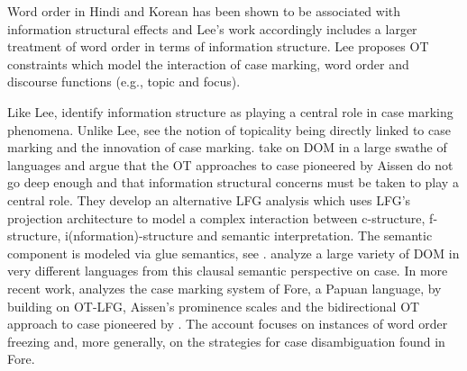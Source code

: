 \documentclass[output=paper,hidelinks]{langscibook}
\begin{document}
 Word order in Hindi and Korean has been shown to be
 associated with information structural effects and Lee's work accordingly
 includes a larger treatment of word order in terms of information structure.
 Lee proposes OT constraints which model the interaction of case marking,
 word order and discourse functions (e.g., topic and focus). 



 Like Lee, \citet{DN} identify information structure as playing a central role in
 case marking phenomena. Unlike Lee, \citet{DN} see the notion of topicality
 being directly linked to case marking and the innovation of case marking.
 \citet{DN} take on DOM in a large swathe of languages and argue that the OT
 approaches to case pioneered by Aissen do not go deep enough and that
 information structural concerns must be taken to play a central role.  They
 develop an alternative LFG analysis which uses LFG's projection architecture to
 model a complex interaction between c-structure, f-structure,
 i(nformation)-structure and semantic interpretation.  The semantic component is
 modeled via glue semantics, see .  \citet{DN} analyze a
 large variety of DOM in very different languages from this clausal semantic
 perspective on case.  In more recent work, \citet{donohue20} analyzes the case
 marking system of Fore, a Papuan language, by building on OT-LFG, Aissen's
 prominence scales and the bidirectional OT approach to case pioneered by
 \citet{Lee-CSLI,lee01-diss}. The account focuses on instances of word order
 freezing and, more generally, on the strategies for case disambiguation  found in Fore.
\end{document}
